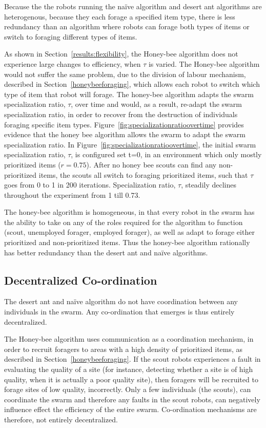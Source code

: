 Because the the robots running the na\"ive algorithm and desert ant algorithms are heterogenous, because they each forage a specified item type, there is less redundancy than an algorithm where robots can forage both types of items or switch to foraging different types of items.

As shown in Section~\ref{results:flexibility}, the Honey-bee algorithm does not experience large changes to efficiency, when $\tau$ is varied. The Honey-bee algorithm would not suffer the same problem, due to the division of labour mechanism, described in Section~\ref{honeybeeforaging}, which allows each robot to switch which type of item that robot will forage. The honey-bee algorithm adapts the swarm specialization ratio, $\tau$, over time and would, as a result, re-adapt the swarm specialization ratio, in order to recover from the destruction of individuals foraging specific item types. Figure~\ref{fig:specializationratioovertime} provides evidence that the honey bee algorithm allows the swarm to adapt the swarm specialization ratio. In Figure~\ref{fig:specializationratioovertime}, the initial swarm specialization ratio, $\tau$, is configured set t=0, in an environment which only mostly prioritized items ($r=0.75$). After no honey bee scouts can find any non-prioritized items, the scouts all switch to foraging prioritized items, such that $\tau$ goes from 0 to 1 in 200 iterations. Specialization ratio, $\tau$, steadily declines throughout the experiment from 1 till 0.73.



The honey-bee algorithm is homogeneous, in that every robot in the swarm has the ability to take on any of the roles required for the algorithm to function (scout, unemployed forager, employed forager), as well as adapt to forage either prioritized and non-prioritized items. Thus the honey-bee algorithm rationally has better redundancy than the desert ant and na\"ive algorithms.

\subsection{Decentralized Co-ordination}
\label{results:decentralizedcoordination}


The desert ant and na\"ive algorithm do not have coordination between any individuals in the swarm. Any co-ordination that emerges is thus entirely decentralized. 

The Honey-bee algorithm uses communication as a coordination mechanism, in order to recruit foragers to areas with a high density of prioritized items, as described in Section~\ref{honeybeeforaging}. If the scout robots experiences a fault in evaluating the quality of a site (for instance, detecting whether a site is of high quality, when it is actually a poor quality site), then foragers will be recruited to forage sites of low quality, incorrectly. Only a few individuals (the scouts), can coordinate the swarm and therefore any faults in the scout robots, can negatively influence effect the efficiency of the entire swarm. Co-ordination mechanisms are therefore, not entirely decentralized.

